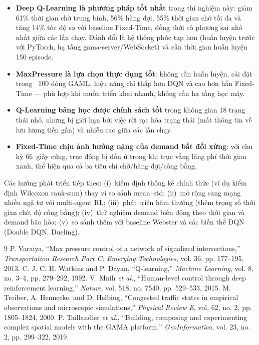 \documentclass[11pt,a4paper]{article}
\begin{document}
\begin{itemize}[leftmargin=*]
    \item \textbf{Deep Q-Learning là phương pháp tốt nhất} trong thí nghiệm này:
    giảm 61\% thời gian chờ trung bình, 56\% hàng đợi, 55\% thời gian chờ tối đa
    và tăng 14\% tốc độ so với baseline Fixed-Time, đồng thời có phương sai nhỏ
    nhất giữa các lần chạy. Đánh đổi là hệ thống phức tạp hơn (huấn luyện trước
    với PyTorch, hạ tầng gama-server/WebSocket) và cần thời gian huấn luyện
    150 episode.
    \item \textbf{MaxPressure là lựa chọn thực dụng tốt}: không cần huấn luyện,
    cài đặt trong ~100 dòng GAML, hiệu năng chỉ thấp hơn DQN và cao hơn hẳn
    Fixed-Time --- phù hợp khi muốn triển khai nhanh, không cần hạ tầng học máy.
    \item \textbf{Q-Learning bảng học được chính sách tốt} trong không gian 18
    trạng thái nhỏ, nhưng bị giới hạn bởi việc rời rạc hóa trạng thái (mất thông
    tin về lưu lượng tiến gần) và nhiễu cao giữa các lần chạy.
    \item \textbf{Fixed-Time chịu ảnh hưởng nặng của demand bất đối xứng}: với
    chu kỳ 66~giây cứng, trục đông bị dồn ứ trong khi trục vắng lãng phí thời gian
    xanh, thể hiện qua cả ba tiêu chí chờ/hàng đợi/công bằng.
\end{itemize}

Các hướng phát triển tiếp theo: (i)~kiểm định thống kê chính thức (ví dụ kiểm định
Wilcoxon rank-sum) thay vì so sánh mean--std; (ii)~mở rộng sang mạng nhiều ngã tư
với multi-agent RL; (iii)~phát triển hàm thưởng (thêm trọng số thời gian chờ, độ
công bằng); (iv)~thử nghiệm demand biến động theo thời gian và demand bão hòa;
(v)~so sánh thêm với baseline Webster và các biến thể DQN (Double DQN, Dueling).

\begin{thebibliography}{9}
 P. Varaiya, ``Max pressure control of a network of
signalized intersections,'' \emph{Transportation Research Part C: Emerging
Technologies}, vol. 36, pp. 177--195, 2013.
 C. J. C. H. Watkins and P. Dayan, ``Q-learning,''
\emph{Machine Learning}, vol. 8, no. 3--4, pp. 279--292, 1992.
 V. Mnih \emph{et al.}, ``Human-level control through deep
reinforcement learning,'' \emph{Nature}, vol. 518, no. 7540, pp. 529--533, 2015.
 M. Treiber, A. Hennecke, and D. Helbing, ``Congested
traffic states in empirical observations and microscopic simulations,''
\emph{Physical Review E}, vol. 62, no. 2, pp. 1805--1824, 2000.
 P. Taillandier \emph{et al.}, ``Building, composing and
experimenting complex spatial models with the GAMA platform,''
\emph{GeoInformatica}, vol. 23, no. 2, pp. 299--322, 2019.
\end{thebibliography}
\end{document}

